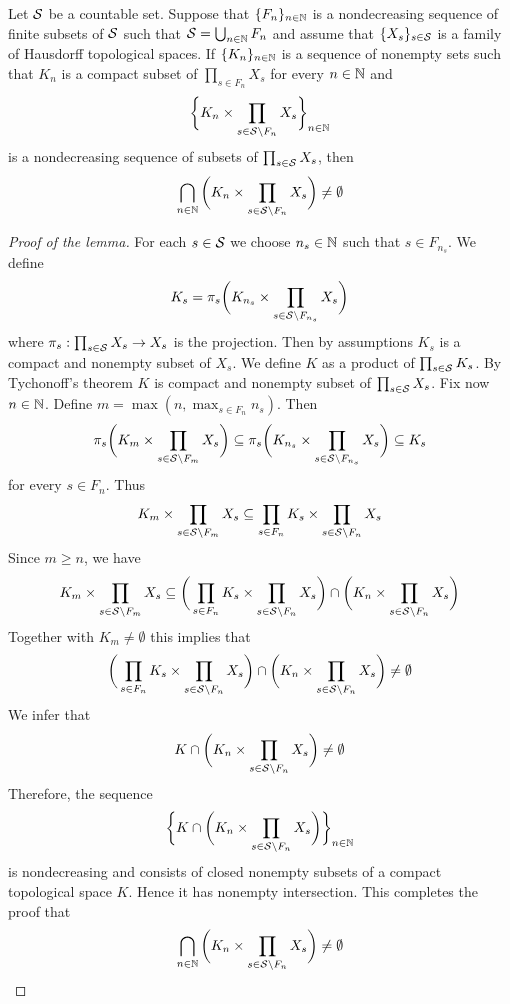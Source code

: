\documentclass[10pt]{amsart}
\begin{document}
\begin{lemma}\label{lemma:topological_part_kolmogorov_extension}
	Let ${\mathcal S}$ be a countable set. Suppose that $\{F_n\}_{n\in {\mathbb N}}$ is a nondecreasing sequence of finite subsets of ${\mathcal S}$ such that ${\mathcal S} = \bigcup_{n\in {\mathbb N}}F_n$ and assume that $\{X_s\}_{s\in {\mathcal S}}$ is a family of Hausdorff topological spaces. If $\{K_n\}_{n\in {\mathbb N}}$ is a sequence of nonempty sets such that $K_n$ is a compact subset of $\prod_{s\in F_n}X_s$ for every $n\in {\mathbb N}$ and
	$$\bigg\{K_n\times \prod_{s\in {\mathcal S}\setminus F_n}X_s\bigg\}_{n\in {\mathbb N}}$$
	is a nondecreasing sequence of subsets of $\prod_{s\in {\mathcal S}}X_s$, then
	$$\bigcap_{n\in {\mathbb N}}\bigg(K_n\times \prod_{s\in {\mathcal S}\setminus F_n}X_s\bigg) \neq \emptyset$$
\end{lemma}
\begin{proof}[Proof of the lemma]
	For each $s\in {\mathcal S}$ we choose $n_s\in {\mathbb N}$ such that $s \in F_{n_s}$. We define
	$$K_{s} = \pi_{s}\bigg(K_{n_s}\times \prod_{s\in {\mathcal S}\setminus F_{n_s}}X_s\bigg)$$
	where $\pi_s:\prod_{s\in {\mathcal S}}X_s\rightarrow X_s$ is the projection. Then by assumptions $K_{s}$ is a compact and nonempty subset of $X_s$. We define $K$ as a product of $\prod_{s\in {\mathcal S}}K_s$. By Tychonoff's theorem $K$ is compact and nonempty subset of $\prod_{s\in {\mathcal S}}X_s$. Fix now $n\in {\mathbb N}$. Define $m = \max\left(n,\max_{s\in F_n}n_s\right)$. Then
	$$\pi_s\bigg(K_{m}\times \prod_{s\in {\mathcal S}\setminus F_{m}}X_s\bigg) \subseteq \pi_s\bigg(K_{n_s}\times \prod_{s\in {\mathcal S}\setminus F_{n_s}}X_s\bigg)\subseteq K_s$$
	for every $s\in F_n$. Thus
	$$K_{m}\times \prod_{s\in {\mathcal S}\setminus F_{m}}X_s \subseteq \prod_{s\in F_n}K_s\times \prod_{s\in {\mathcal S}\setminus F_n}X_s$$
	Since $m\geq n$, we have
	$$K_{m}\times \prod_{s\in {\mathcal S}\setminus F_{m}}X_s \subseteq \bigg(\prod_{s\in F_n}K_s\times \prod_{s\in {\mathcal S}\setminus F_n}X_s\bigg)\cap \bigg(K_n\times \prod_{s\in {\mathcal S}\setminus F_n}X_s\bigg)$$
	Together with $K_m\neq \emptyset$ this implies that
	$$\bigg(\prod_{s\in F_n}K_s\times \prod_{s\in {\mathcal S}\setminus F_n}X_s\bigg)\cap \bigg(K_n\times \prod_{s\in {\mathcal S}\setminus F_n}X_s\bigg)\neq \emptyset$$
	We infer that
	$$K\cap \bigg(K_n\times \prod_{s\in {\mathcal S}\setminus F_n}X_s\bigg) \neq \emptyset$$
	Therefore, the sequence
	$$\bigg\{K\cap \bigg(K_n\times \prod_{s\in {\mathcal S}\setminus F_n}X_s\bigg)\bigg\}_{n\in {\mathbb N}}$$
	is nondecreasing and consists of closed nonempty subsets of a compact topological space $K$. Hence it has nonempty intersection. This completes the proof that
	$$\bigcap_{n\in {\mathbb N}}\bigg(K_n\times \prod_{s\in {\mathcal S}\setminus F_n}X_s\bigg) \neq \emptyset$$
\end{proof}
\end{document}
